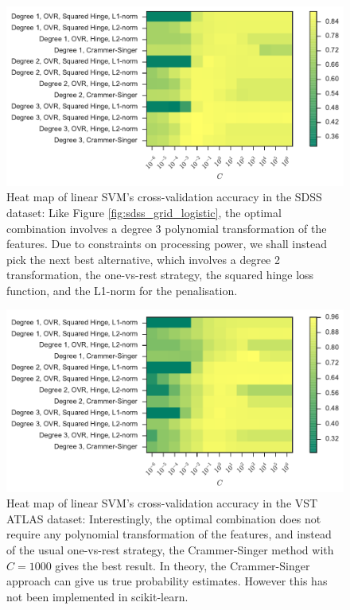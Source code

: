 \begin{figure}[p]
	\centering
	\includegraphics[width=\textwidth]{figures/4_expt1/sdss_grid_poly}
	\caption[Heat map of linear SVM's CV accuracy in SDSS]{
		Heat map of linear SVM's cross-validation accuracy in the SDSS dataset:
		Like Figure \ref{fig:sdss_grid_logistic}, the optimal
		combination involves a degree 3 polynomial transformation of the features.
		Due to constraints on
		processing power, we shall instead pick the next best alternative, which involves
		a degree 2 transformation, the one-vs-rest strategy, the squared hinge loss function,
		and the L1-norm for the penalisation.}
	\label{fig:sdss_grid_poly}
\end{figure}

\begin{figure}[p]
	\centering
	\includegraphics[width=\textwidth]{figures/4_expt1/vstatlas_grid_poly}
	\caption[Heat map of linear SVM's CV accuracy in VST ATLAS]{
		Heat map of linear SVM's cross-validation accuracy in the VST ATLAS dataset:
		Interestingly, the optimal combination does not require any polynomial
		transformation of the features, and instead of the usual one-vs-rest strategy,
		the Crammer-Singer method
		with $C = 1000$ gives the best result. In theory, the Crammer-Singer approach
		can give us true probability estimates. However this has not been implemented
		in scikit-learn.}
	\label{fig:vstatlas_grid_poly}
\end{figure}

